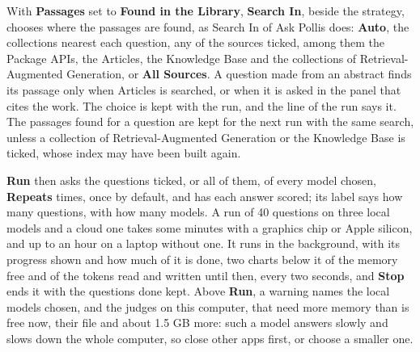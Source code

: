 With \textbf{Passages} set to \textbf{Found in the Library}, \textbf{Search In}, beside the strategy, chooses where the
passages are found, as Search In of Ask Pollis does: \textbf{Auto}, the collections nearest each question, any of the
sources ticked, among them the Package APIs, the Articles, the Knowledge Base and the collections of
Retrieval-Augmented Generation, or \textbf{All Sources}. A question made from an abstract finds its passage only when
Articles is searched, or when it is asked in the panel that cites the work. The choice is kept with the run, and the
line of the run says it. The passages found for a question are kept for the next run with the same search, unless a
collection of Retrieval-Augmented Generation or the Knowledge Base is ticked, whose index may have been built again.

\textbf{Run} then asks the questions ticked, or all of them, of every model chosen, \textbf{Repeats} times, once by
default, and has each answer scored; its label says how many questions, with how many models. A run of 40 questions on
three local models and a cloud one takes some minutes with a graphics chip or Apple silicon, and up to an hour on a
laptop without one. It runs in the background, with its progress shown and how much of it is done, two charts below it of the memory free and of the tokens read and written until then, every two seconds, and \textbf{Stop} ends it with the
questions done kept. Above \textbf{Run}, a warning names the local models chosen, and the judges on this computer,
that need more memory than is free now, their file and about 1.5 GB more: such a model answers slowly and slows down
the whole computer, so close other apps first, or choose a smaller one.

